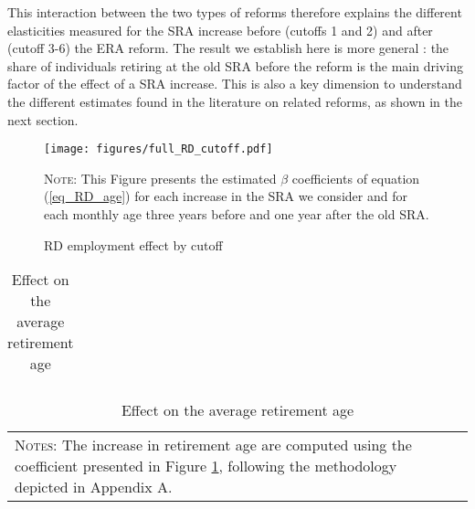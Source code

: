 \documentclass[12pt,a4paper]{article}
\begin{document}
This interaction between the two types of reforms therefore explains the different elasticities measured for the SRA increase before (cutoffs 1 and 2) and after (cutoff 3-6) the ERA reform. The result we establish here is more general : the share of individuals retiring at the old SRA before the reform is the main driving factor of the effect of a SRA increase. This is also a key dimension to understand the different estimates found in the literature on related reforms, as shown in the next section.



\begin{figure}[H]
	\begin{adjustwidth}{-1in}{-1in}	
\caption{RD employment effect by cutoff}
\label{full_RD_cutoff}
\centering
\texttt{[image: figures/full\_RD\_cutoff.pdf]}
\end{adjustwidth}
\begin{minipage}{15cm}%
\scriptsize
\textsc{Note:} This Figure presents the estimated $\beta$ coefficients of equation (\ref{eq_RD_age}) for each increase in the SRA we consider and for each monthly age three years before and one year after the old SRA. 
\end{minipage}%
\end{figure}

\begin{table}[!t] 
	\begin{adjustbox}{max width = \textwidth, max totalheight=.6\textheight, keepaspectratio}
		\hspace*{-1cm}
		
		\caption{Effect on the average retirement age}
		\label{table_average_cutoff}
		\footnotesize
		\begin{tabular}{lcccccc}
			\toprule
			 		
		\end{tabular}
		\hspace*{-1cm}
	\end{adjustbox}
	
	\vspace*{-0.4cm}
	\begin{tabular}{ll}
		\footnotesize
		\begin{minipage}{12cm}%
			\textsc{Notes:} The increase in retirement age are computed using the coefficient presented in Figure \ref{full_RD_cutoff}, following the methodology depicted in Appendix A. 
		\end{minipage}%
	\end{tabular}
	\end{table}
\end{document}
